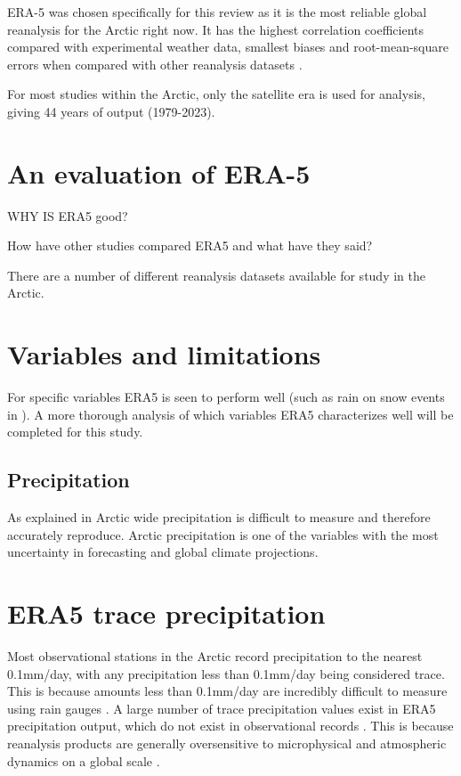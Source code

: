 \documentclass[12pt, oneside]{article}
\begin{document}
ERA-5 was chosen specifically for this review as it is the most reliable global reanalysis for the Arctic right now. It has the highest correlation coefficients compared with experimental weather data, smallest biases and root-mean-square errors when compared with other reanalysis datasets \cite{graham2019improved, hillebrand2021comparison}. 

For most studies within the Arctic, only the satellite era is used for analysis, giving 44 years of output (1979-2023).




\section{An evaluation of ERA-5}
WHY IS ERA5 good?

How have other studies compared ERA5 and what have they said?

There are a number of different reanalysis datasets available for study in the Arctic. 



\section{Variables and limitations}\label{Hydrological variables and limitations }
For specific variables ERA5 is seen to perform well (such as rain on snow events in \cite{dou2021trends}). A more thorough analysis of which variables ERA5 characterizes well will be completed for this study.


\subsection{Precipitation}\label{precipitation}
As explained in \cite{boisvert2018intercomparison} Arctic wide precipitation is difficult to measure and therefore accurately reproduce. Arctic precipitation is one of the variables with the most uncertainty in forecasting and global climate projections. 

\section{ERA5 trace precipitation}\label{traceprecip}
Most observational stations in the Arctic record precipitation to the nearest 0.1mm/day, with any precipitation less than 0.1mm/day being considered trace. This is because amounts less than 0.1mm/day are incredibly difficult to measure using rain gauges \cite[p.~3-50]{meteorological2015manobs}. A large number of trace precipitation values exist in ERA5 precipitation output, which do not exist in observational records \cite{shen2022performance}. This is because reanalysis products are generally oversensitive to microphysical and atmospheric dynamics on a global scale \cite{boisvert2018intercomparison}. 
\end{document}
